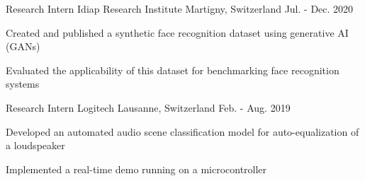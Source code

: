 \begin{cventries}
  \cventry
    {Research Intern} %
    {Idiap Research Institute} %
    {Martigny, Switzerland} %
    {Jul. - Dec. 2020} %
    {
      \begin{cvitems} %
        \item {Created and published a synthetic face recognition dataset using generative AI (GANs)}
        \item {Evaluated the applicability of this dataset for benchmarking face recognition systems}
      \end{cvitems}
    }

  \cventry
    {Research Intern} %
    {Logitech} %
    {Lausanne, Switzerland} %
    {Feb. - Aug. 2019} %
    {
      \begin{cvitems} %
        \item {Developed an automated audio scene classification model for auto-equalization of a loudspeaker}
        \item {Implemented a real-time demo running on a microcontroller}
      \end{cvitems}
    }

\end{cventries}
